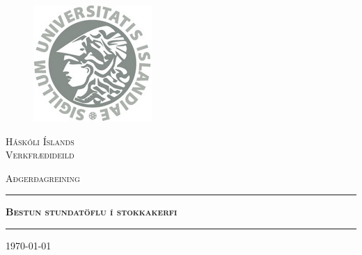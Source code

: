 \documentclass[a4paper,12pt]{article}
\begin{document}
\begin{titlepage}
\begin{center}
\begin{minipage}{0.4\textwidth}
\begin{flushleft} 
\vspace{10mm}
        \begin{figure}[H]
      \includegraphics[width=0.4\linewidth]{HI_merki.jpg}
        \label{fig: logo}
        \end{figure}
\end{flushleft}
\end{minipage}
\begin{minipage}{0.4\textwidth}
\begin{flushright} \large
\textsc{Háskóli Íslands\\Verkfræðideild}
\end{flushright}
\end{minipage}

\vspace{4cm}





{\textsc{\Large Aðgerðagreining}\\[0.5cm]}

\vspace{0.8cm}
\begin{center}
\rule{1\textwidth}{3pt}

{\textsc{ \LARGE \bfseries Bestun stundatöflu í stokkakerfi}} \\[0.4cm]



\rule{1\textwidth}{4pt}
\vspace{2cm}

\end{center}
\today

\vfill


\end{center}
\end{titlepage}
\end{document}
